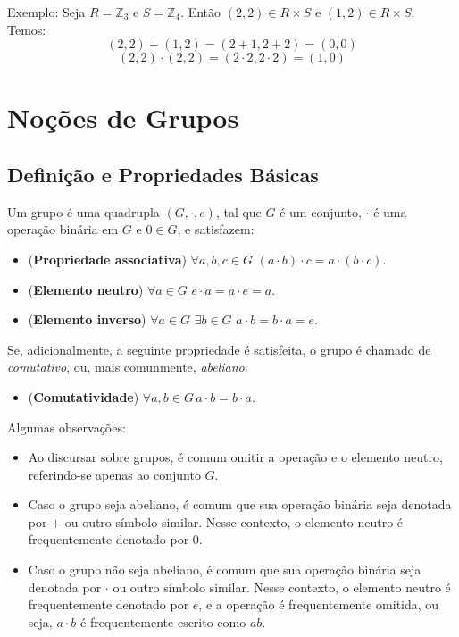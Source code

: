     Exemplo: Seja $R=\mathbb Z_3$ e $S=\mathbb Z_4$. Então $(2, 2)\in R\times S$ e $(1, 2)\in R\times S$. Temos:
    $$(2, 2)+(1, 2)=(2+ 1, 2+ 2)=(0, 0)$$
    $$(2, 2)\cdot (2, 2)=(2\cdot 2, 2\cdot 2)=(1, 0)$$
\section{Noções de Grupos}


\subsection{Definição e Propriedades Básicas}
\begin{definition}
Um grupo é uma quadrupla $(G,\cdot,e)$, tal que $G$ é um conjunto, $\cdot$ é uma operação binária em $G$ e $0 \in G$, e satisfazem:

\begin{itemize}
    \item (\textbf{Propriedade associativa}) $\forall a, b, c \in G$ $(a \cdot b) \cdot c = a \cdot (b \cdot c)$.
    \item (\textbf{Elemento neutro}) $\forall a \in G$  $e \cdot a = a \cdot e = a$.
    \item (\textbf{Elemento inverso}) $\forall a \in G$ $\exists b \in G$ $a \cdot b = b \cdot a = e$.
\end{itemize}
Se, adicionalmente, a seguinte propriedade é satisfeita, o grupo é chamado de \emph{comutativo}, ou, mais comunmente, \emph{abeliano}:
\begin{itemize}
    \item (\textbf{Comutatividade}) $\forall a, b \in G\, a \cdot b = b \cdot a$.
\end{itemize}
\end{definition}
Algumas observações:
\begin{itemize}
\item Ao discursar sobre grupos, é comum omitir a operação e o elemento neutro, referindo-se apenas ao conjunto $G$.
\item Caso o grupo seja abeliano, é comum que sua operação binária seja denotada por $+$ ou outro símbolo similar. Nesse contexto, o elemento neutro é frequentemente denotado por $0$.
\item Caso o grupo não seja abeliano, é comum que sua operação binária seja denotada por $\cdot$ ou outro símbolo similar. Nesse contexto, o elemento neutro é frequentemente denotado por $e$, e a operação é frequentemente omitida, ou seja, $a \cdot b$ é frequentemente escrito como $ab$.
\end{itemize}

